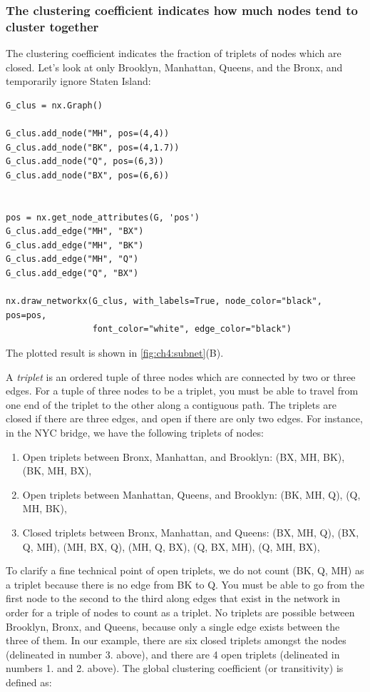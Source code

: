 \subsubsection{The clustering coefficient indicates how much nodes tend to cluster together}
\label{sec:ch4:prop-net:clustering}

The clustering coefficient indicates the fraction of triplets of nodes which are closed. Let's look at only Brooklyn, Manhattan, Queens, and the Bronx, and temporarily ignore Staten Island:

\begin{lstlisting}[style=python]
G_clus = nx.Graph()

G_clus.add_node("MH", pos=(4,4))
G_clus.add_node("BK", pos=(4,1.7))
G_clus.add_node("Q", pos=(6,3))
G_clus.add_node("BX", pos=(6,6))


pos = nx.get_node_attributes(G, 'pos')
G_clus.add_edge("MH", "BX")
G_clus.add_edge("MH", "BK")
G_clus.add_edge("MH", "Q")
G_clus.add_edge("Q", "BX")

nx.draw_networkx(G_clus, with_labels=True, node_color="black", pos=pos,
                 font_color="white", edge_color="black")
\end{lstlisting}
The plotted result is shown in \ref{fig:ch4:subnet}(B).

A \textit{triplet} is an ordered tuple of three nodes which are connected by two or three edges. For a tuple of three nodes to be a triplet, you must be able to travel from one end of the triplet to the other along a contiguous path. The triplets are {closed} if there are three edges, and {open} if there are only two edges. For instance, in the NYC bridge, we have the following triplets of nodes:
\begin{enumerate}
    \item Open triplets between Bronx, Manhattan, and Brooklyn: (BX, MH, BK), (BK, MH, BX),
    \item Open triplets between Manhattan, Queens, and Brooklyn: (BK, MH, Q), (Q, MH, BK),
    \item Closed triplets between Bronx, Manhattan, and Queens: (BX, MH, Q), (BX, Q, MH), (MH, BX, Q), (MH, Q, BX), (Q, BX, MH), (Q, MH, BX),
\end{enumerate}

To clarify a fine technical point of open triplets, we do not count (BK, Q, MH) as a triplet because there is no edge from BK to Q. You must be able to go from the first node to the second to the third along edges that exist in the network in order for a triple of nodes to count as a triplet. No triplets are possible between Brooklyn, Bronx, and Queens, because only a single edge exists between the three of them. In our example, there are six closed triplets amongst the nodes (delineated in number 3. above), and there are 4 open triplets (delineated in numbers 1. and 2. above). The global clustering coefficient (or transitivity) is defined as:

